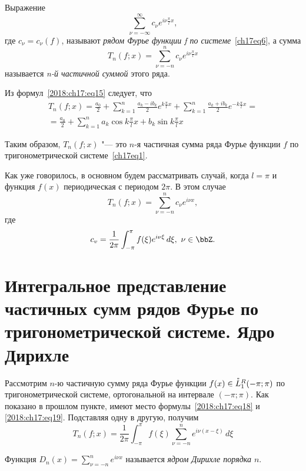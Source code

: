 \begin{defn}
Выражение
\begin{equation}
\sum_{\nu = -\infty}^{\infty} c_{\nu}e^{i\nu\frac{\pi}{l}x},
\end{equation}
где $c_{\nu} = c_{\nu}(f)$, называют \textit{рядом Фурье функции f по системе}~\eqref{ch17eq6}, а сумма
\begin{equation}
T_{n}(f;x) = \sum_{\nu = -n}^{n} c_{\nu}e^{i\nu\frac{\pi}{l}x}
\end{equation}
называется \textit{n-й частичной суммой} этого ряда.
\end{defn}

Из формул~\eqref{2018:ch17:eq15} следует, что
\begin{multline*}
T_{n}(f;x) = \frac{a_0}{2} + \sum_{k = 1}^{n} \frac{a_k-ib_k}{2} e^{k\frac{\pi}{l}x} + \sum_{k = 1}^{n} \frac{a_k + ib_k}{2} e^{-k\frac{\pi}{l}x} =\\ = \frac{a_0}{2} + \sum_{k = 1}^{n} a_{k} \cos k\frac{\pi}{l}x + b_{k} \sin k\frac{\pi}{l}x
\end{multline*}

Таким образом, $T_{n}(f;x)$ "--- это $n$-я частичная сумма ряда Фурье функции $f$ по тригонометрической системе~\eqref{ch17eq1}.

Как уже говорилось, в основном будем рассматривать случай, когда $l=\pi$ и функция $f(x)$ периодическая с периодом $2\pi$. В этом случае
\begin{equation}\label{2018:ch17:eq18}
T_{n}(f;x) = \sum_{\nu = -n}^{n} c_{\nu}e^{i\nu x},
\end{equation}
где
\begin{equation}\label{2018:ch17:eq19}
c_v = \frac{1}{2\pi} \int_{-\pi}^{\pi} f(\xi) e^{i\nu \xi}\,d\xi,\ \nu\in\bbZ.
\end{equation}

\section{Интегральное представление частичных сумм рядов Фурье по тригонометрической системе. Ядро Дирихле}

Рассмотрим $n$-ю частичную сумму ряда Фурье функции $f(x)\in \accentset{*}{L}^{R}_1(-\pi;\pi)$ по тригонометрической системе, ортогональной на интервале $(-\pi;\pi)$. Как показано в прошлом пункте, имеют место формулы~\eqref{2018:ch17:eq18} и  \eqref{2018:ch17:eq19}. Подставляя одну в другую, получим
$$
T_{n}(f;x) = \frac{1}{2\pi} \int_{-\pi}^{\pi} f(\xi) \sum_{\nu = -n}^{n} e^{i\nu(x-\xi)}\,d\xi
$$
\begin{defn}
Функция $D_n(x) = \sum_{\nu = -n}^{n} e^{i\nu x}$ называется \textit{ядром Дирихле порядка $n$}.
\end{defn}

